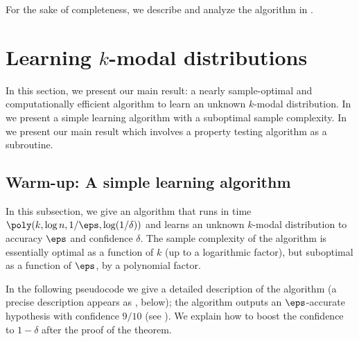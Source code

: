 %


\noindent For the sake of completeness, we describe and analyze the  algorithm
in .

%

%

\section{Learning \texorpdfstring{$k$-modal}{k-modal} distributions} \label{sec:learning}

%


In this section, we present our main result: a nearly sample-optimal
and computationally efficient algorithm to learn an unknown $k$-modal
distribution.
In  we present a simple learning
algorithm with a suboptimal sample complexity.
In  we present our main result which involves
a property testing algorithm as a subroutine.

\subsection{Warm-up: A simple learning algorithm} \label{ssec:kmodal-learn-simple}

In this subsection, we give an algorithm that runs in time $\poly(k, \log n, 1/\eps, \log(1/\delta))$
and learns an unknown $k$-modal distribution to accuracy $\eps$ and confidence $\delta$.
The sample complexity of the algorithm is {essentially optimal as a function of $k$ (up to a logarithmic factor), but}
suboptimal as a function of $\eps$, by a polynomial factor.

In the following {pseudocode} we give a detailed description of the
algorithm \hyperref[alg:learn-kmodal-simple]{}
%
(a precise description appears as
, below);
%
{the algorithm outputs} an $\eps$-accurate hypothesis with confidence $9/10$ (see ). 
We explain how to boost the confidence to $1-\delta$ after the proof of the theorem.

